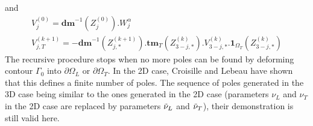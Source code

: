 and
\begin{equation}
\begin{matrix}
V_{j}^{(0)}=\textbf{dm}^{-1}(Z_{j}^{(0)}).W_j^{\alpha}\\
V_{j,T}^{(k+1)}=-\textbf{dm}^{-1}(Z_{j,*}^{(k+1)}).\textbf{tm}_T(Z_{3-j,*}^{(k)}).V_{3-j,*}^{(k)}.\textbf{1}_{\Omega_T}(Z_{3-j,*}^{(k)}) 
\end{matrix}
\label{C4:residuscr}
\end{equation}
The recursive procedure stops when no more poles can be found by deforming contour $\Gamma_0$ into $\partial \Omega_L$ or $\partial \Omega_T$. In the 2D case, Croisille and Lebeau \cite{CroisilleLebeau} have shown that this defines a finite number of poles. The sequence of poles generated in the 3D case being similar to the ones generated in the 2D case (parameters $\nu_L$ and $\nu_T$ in the 2D case are replaced by parameters $\tilde{\nu}_L$ and $\tilde{\nu}_T$), their demonstration is still valid here. 
